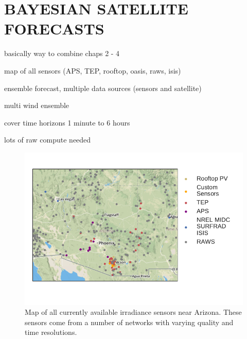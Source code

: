 \chapter{BAYESIAN SATELLITE FORECASTS}
\label{chap:satfx}

basically way to combine chaps 2 - 4

map of all sensors (APS, TEP, rooftop, oasis, raws, isis)

ensemble forecast, multiple data sources (sensors and satellite)

multi wind ensemble

cover time horizons 1 minute to 6 hours

lots of raw compute needed

\begin{figure}
\centering
\includegraphics[width=\textwidth]{figs/azmap.pdf}
\vspace{-3em}
\caption[Map of all available irradiance sensors]{Map of all currently
available irradiance sensors near Arizona. These sensors come from a
number of networks with varying quality and time resolutions.}
\label{fig:allsensors}
\end{figure}

